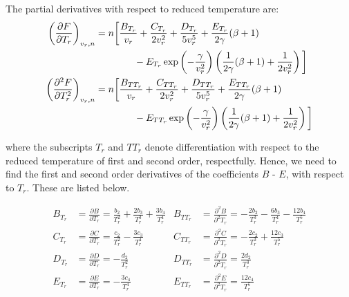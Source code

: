 \documentclass[internal,english]{sintefmemo2012}
\numberwithin{equation}{section}
\begin{document}
The partial derivatives with respect to reduced temperature are:
\begin{align}
  \phantom{\left( \frac{\partial^2 F}{\partial T_r^2} \right)_{v_r, n}}
  & \begin{aligned} \label{eq:F_Tr}
    \mathllap{\left( \frac{\partial F}{\partial T_r} \right)_{v_r, n}}
   & = n \bigg[ \frac{B_{T_r}}{v_r} + \frac{C_{T_r}}{2v_r^2} + \frac{D_{T_r}}{5v_r^5} + \frac{E_{T_r}}{2\gamma} (\beta + 1) \\
    & \qquad \qquad- E_{T_r}\exp \left(-\frac{\gamma}{v_r^2} \right) \left(\frac{1}{2\gamma} (\beta + 1) + \frac{1}{2v_r^2} \right)  \bigg]
  \end{aligned} \\
  & \begin{aligned} \label{eq:F_TrTr}
    \mathllap{\left( \frac{\partial^2 F}{\partial T_r^2} \right)_{v_r, n}}
    & = n \bigg[ \frac{B_{TT_r}}{v_r} + \frac{C_{TT_r}}{2v_r^2} + \frac{D_{TT_r}}{5v_r^5} + \frac{E_{TT_r}}{2\gamma} (\beta + 1) \\
	& \qquad \qquad- E_{TT_r}\exp \left(-\frac{\gamma}{v_r^2} \right) \left(\frac{1}{2\gamma} (\beta + 1) + \frac{1}{2v_r^2} \right)  \bigg]
  \end{aligned}
\end{align}

where the subscripts $T_r$ and $TT_r$ denote differentiation with respect to the reduced temperature of first and second order, respectfully. Hence, we need to find the first and second order derivatives of the coefficients $B$ - $E$, with respect to $T_r$. These are listed below.

\begin{align}
\label{eq:B_Tr}
B_{T_r} & = \frac{\partial B}{\partial T_r} = \frac{b_2}{T_r^2} + \frac{2b_3}{T_r^3} + \frac{3b_4}{T_r^4}  
& B_{TT_r} & = \frac{\partial^2 B}{\partial^2 T_r} = -\frac{2b_2}{T_r^3} - \frac{6b_3}{T_r^4} -\frac{12b_4}{T_r^5} \\
C_{T_r} & = \frac{\partial C}{\partial T_r} = \frac{c_2}{T_r^2} - \frac{3c_3}{T_r^4} 
& C_{TT_r} & = \frac{\partial^2 C}{\partial^2 T_r} = - \frac{2c_2}{T_r^3} + \frac{12c_3}{T_r^5} \\
D_{T_r} &= \frac{\partial D}{\partial T_r} = -\frac{d_2}{T_r^2} 
& D_{TT_r} & = \frac{\partial^2 D}{\partial^2 T_r} = \frac{2d_2}{T_r^3} \\
E_{T_r} & = \frac{\partial E}{\partial T_r} = -\frac{3c_4}{T_r^4} 
& E_{TT_r} & = \frac{\partial^2 E}{\partial^2 T_r} = \frac{12c_4}{T_r^5} \label{eq:E_TrTr}
\end{align}
\end{document}
